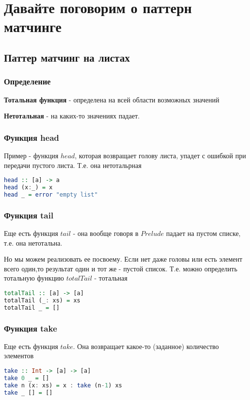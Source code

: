 \documentclass[10pt, a4paper]{article}
\begin{document}
\section{Давайте поговорим о паттерн матчинге}
\subsection{Паттер матчинг на листах}

\subsubsection{Определение}
{\bf Тотальная функция} - определена на всей области возможных значений

{\bf Нетотальная} - на каких-то значениях падает.


\subsubsection{Функция head}
Пример - функция $head$, которая возвращает голову листа, упадет с ошибкой при передачи пустого листа. Т.е. она нетотальрная
\begin{lstlisting}[language=haskell]
head :: [a] -> a
head (x:_) = x
head _ = error "empty list"
\end{lstlisting}

\subsubsection{Функция tail}
Еще есть функция $tail$ - она вообще говоря в $Prelude$ падает на пустом списке, т.е. она нетотальна. 

Но мы можем реализовать ее посвоему. Если нет даже головы или есть элемент всего один,то результат один и тот же - пустой список. Т.е. можно определить тотальную функцию $totalTail$ - тотальная

\begin{lstlisting}[language=haskell]
totalTail :: [a] -> [a]
totalTail (_: xs) = xs
totalTail _ = []
\end{lstlisting}

\subsubsection{Функция take}
Еще есть функция $take$. Она возвращает какое-то (заданное) количество элементов

\begin{lstlisting}[language=haskell]
take :: Int -> [a] -> [a]
take 0 _ = []
take n (x: xs) = x : take (n-1) xs
take _ [] = []
\end{lstlisting}
\end{document}
